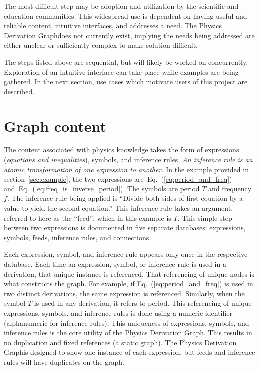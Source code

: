\documentclass{article}
\newcommand{\eqn}[1]{Eq.\ (\ref{#1})}
\newcommand{\pdg}{Physics Derivation Graph}
\begin{document}
\begin{multicols}{2}
The most difficult step may be adoption and utilization by the scientific and education communities. This widespread use is dependent on having useful and reliable content, intuitive interfaces, and addresses a need. The \pdg does not currently exist, implying the needs being addressed are either unclear or sufficiently complex to make solution difficult. 

The steps listed above are sequential, but will likely be worked on concurrently. Exploration of an intuitive interface can take place while examples are being gathered. In the next section, use cases which motivate users of this project are described. 

\section{Graph content\label{sec:content}}

The content associated with physics knowledge takes the form of expressions (\textit{equations and inequalities}), symbols, and inference rules. \textit{An inference rule is an atomic transformation of one expression to another.} In the example provided in section~\ref{sec:example}, the two expressions are~\eqn{eq:period_and_freq} and~\eqn{eq:freq_is_inverse_period}. The symbols are period $T$ and frequency $f$. The inference rule being applied is ``Divide both sides of first equation by a value to yield the second equation.'' This inference rule takes an argument, referred to here as the ``feed'', which in this example is $T$. This simple step between two expressions is documented in five separate databases: expressions, symbols, feeds, inference rules, and connections. 

Each expression, symbol, and inference rule appears only once in the respective database. Each time an expression, symbol, or inference rule is used in a derivation, that unique instance is referenced. That referencing of unique nodes is what constructs the graph. For example, if \eqn{eq:period_and_freq} is used in two distinct derivations, the same expression is referenced. Similarly, when the symbol $T$ is used in any derivation, it refers to period. This referencing of unique expressions, symbols, and inference rules is done using a numeric identifier (alphanumeric for inference rules). This uniqueness of expressions, symbols, and inference rules is the core utility of the \pdg. This results in no duplication and fixed references (a static graph). The \pdg is designed to show one instance of each expression, but feeds and inference rules will have duplicates on the graph. 


\end{multicols}
\end{document}
